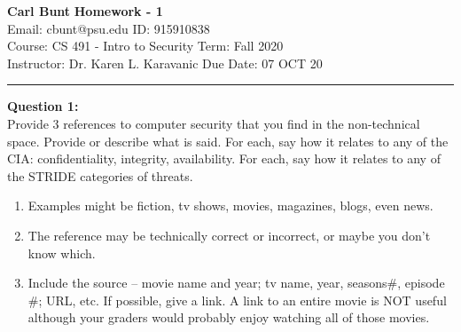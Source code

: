 \documentclass[a4paper, 11pt]{article}
\newenvironment{problem}[2][Question]
               { \begin{mdframed}[backgroundcolor=gray!20] \textbf{#1 #2:} \\}
               {  \end{mdframed}}
\begin{document}
 \noindent
 \large\textbf{Carl Bunt} \hfill \textbf{Homework - 1}   \\
 Email: cbunt@psu.edu \hfill ID: 915910838 \\
 \normalsize Course: CS 491 - Intro to Security \hfill Term: Fall 2020\\
 Instructor: Dr. Karen L. Karavanic \hfill Due Date: 07 OCT 20\\
 \noindent\rule{7in}{2.8pt}

 \begin{problem}{1}
   Provide 3 references to computer security that you find in the non-technical space.  Provide or describe what is said.  For each, say how it relates to any of the CIA:  confidentiality, integrity, availability.  For each, say how it relates to any of the STRIDE categories of threats.
   \begin{enumerate}[label=\alpha*.]
   \item Examples might be fiction, tv shows, movies, magazines, blogs, even news.
   \item The reference may be technically correct or incorrect, or maybe you don’t know which.
   \item Include the source – movie name and year;  tv name, year, seasons#, episode \#; URL, etc.  If possible, give a link.  A link to an entire movie is NOT useful although your graders would probably enjoy watching all of those movies.
   \end{enumerate}
 \end{problem}
\end{document}
